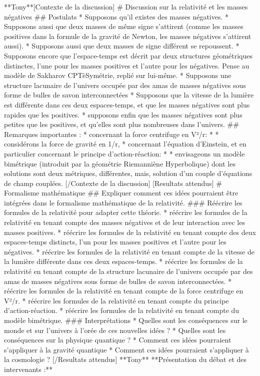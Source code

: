 **Tony**[Contexte de la discussion]
# Discussion sur la relativité et les masses négatives
## Postulats
* Supposons qu'il existes des masses négatives. 
* Supposons aussi que deux masses de même signe s'attirent (comme les masses positives dans la formule de la gravité de Newton, les masses négatives s'attirent aussi). 
* Supposons aussi que deux masses de signe différent se repoussent. 
* Supposons encore que l'espace-temps est décrit par deux structures géométriques distinctes, l'une pour les masses positives et l'autre pour les négatives. 
    Pense au modèle de Sakharov CPTèSymétrie, replié sur lui-même.
* Supposons une structure lacunaire de l’univers occupée par des amas de masses négatives sous forme de bulles de savon interconnectées
* Supposons que la vitesse de la lumière est différente dans ces deux espaces-temps, et que les masses négatives sont plus rapides que les positives.
* supposons enfin que les masses négatives sont plus petites que les positives, et qu'elles sont plus nombreuses dans l'univers.
## Remarques importantes : 
* concernant la force centrifuge en V²/r:
* * considérons la force de gravité en 1/r,  
* concernant l'équation d'Einstein, et en particulier concernant le principe d'action-réaction:
* * envisageons un modèle bimétrique (introduit par la géométrie Riemanniène Hyperbolique) dont les solutions sont deux métriques, différentes, mais, solution d'un couple d'équations de champ couplées.
[/Contexte de la discussion]
[Resultats attendus]
# Formalisme mathématique
## Expliquer comment ces idées pourraient être intégrées dans le formalisme mathématique de la relativité.
### Réécrire les formules de la relativité pour adapter cette théorie.
* réécrire les formules de la relativité en tenant compte des masses négatives et de leur interaction avec les masses positives.
* réécrire les formules de la relativité en tenant compte des deux espaces-temps distincts, l'un pour les masses positives et l'autre pour les négatives.
* réécrire les formules de la relativité en tenant compte de la vitesse de la lumière différente dans ces deux espaces-temps.
* réécrire les formules de la relativité en tenant compte de la structure lacunaire de l'univers occupée par des amas de masses négatives sous forme de bulles de savon interconnectées.
* réécrire les formules de la relativité en tenant compte de la force centrifuge en V²/r.
* réécrire les formules de la relativité en tenant compte du principe d'action-réaction.
* réécrire les formules de la relativité en tenant compte du modèle bimétrique.
### Interprétations
* Quelles sont les conséquences sur le monde et sur l'univers à l'orée de ces nouvelles idées ?
* Quelles sont les conséquences sur la physique quantique ?
* Comment ces idées pourraient s'appliquer à la gravité quantique
* Comment ces idées pourraient s'appliquer à la cosmologie ?
[/Resultats attendus]
**Tony**
**Présentation du débat et des intervenants :**  

